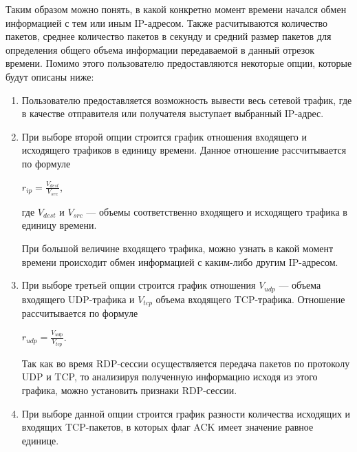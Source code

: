 \documentclass[bachelor, och, coursework]{SCWorks}
\begin{document}
  Таким образом можно понять, в какой конкретно момент времени начался обмен информацией с тем или иным 
  IP-адресом. Также расчитываются количество пакетов, среднее количество пакетов в секунду и средний размер пакетов для определения общего объема 
  информации передаваемой в данный отрезок времени. Помимо этого пользователю предоставляются некоторые опции, которые будут описаны ниже:
  
  \begin{enumerate}
    \item Пользователю предоставляется возможность вывести весь сетевой трафик, где в качестве отправителя или получателя выступает выбранный IP-адрес.
    \item При выборе второй опции строится график отношения входящего и исходящего трафиков в единицу времени. Данное отношение рассчитывается по формуле
    
    \begin{center}
      $r_{ip} = \frac{V_{dest}}{V_{src}}$,
    \end{center}

    где $V_{dest}$ и $V_{src}$ --- объемы соответственно входящего и исходящего трафика в единицу времени. 
     
    При большой величине входящего трафика, можно узнать в какой момент времени происходит обмен информацией с каким-либо другим IP-адресом.
    \item При выборе третьей опции строится график отношения $V_{udp}$ --- объема входящего UDP-трафика и $V_{tcp}$ объема входящего TCP-трафика.
    Отношение рассчитывается по формуле

    \begin{center}
      $r_{udp} = \frac{V_{udp}}{V_{tcp}}$.
    \end{center}

    Так как во время RDP-сессии осуществляется передача пакетов по протоколу UDP и TCP, то анализируя полученную информацию исходя из этого графика,
    можно установить признаки RDP-сессии.

    \item При выборе данной опции строится график разности количества исходящих и входящих TCP-пакетов, в которых флаг ACK имеет значение
    равное единице.


\end{enumerate}
\end{document}
